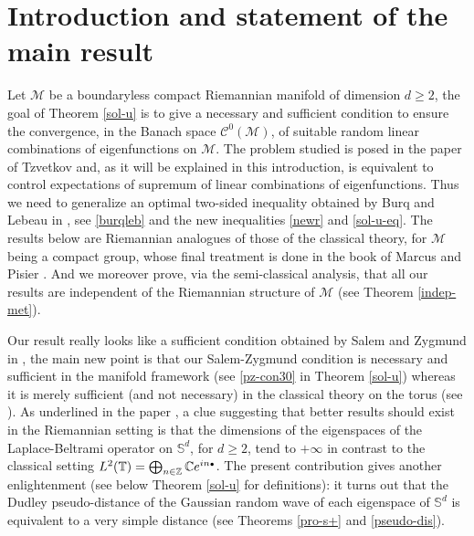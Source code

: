 \documentclass[11pt]{article}
\newcommand{\sbullet}{{\scriptscriptstyle\bullet}}
\theoremstyle{theorem}
\theoremstyle{definition}
\newcommand\Z{\mathbb{Z}}
\newcommand\CC{\mathcal{C}}
\newcommand\bbS{\mathbb{S}}
\begin{document}
\section{Introduction and statement of the main result}
Let $\mathcal{M}$ be a boundaryless compact Riemannian manifold of dimension $d\geq 2$, the goal of Theorem \ref{sol-u} is to give a necessary and sufficient condition to ensure the convergence, in the Banach space $\CC^0(\mathcal{M})$, of suitable random linear combinations of eigenfunctions on $\mathcal{M}$. The problem studied is posed in the paper of Tzvetkov \cite[p.\,XV]{Tzvetkov4} and, as it will be explained in this introduction, is equivalent to control expectations of supremum of linear combinations of eigenfunctions. Thus we need to generalize an optimal two-sided inequality obtained by Burq and Lebeau in \cite{burq-lebeau,burq-lebeau2}, see \eqref{burqleb} and the new inequalities \eqref{newr} and \eqref{sol-u-eq}.
The results below are Riemannian analogues of those of the classical theory, for $\mathcal{M}$ being a compact group, whose final treatment is done in the book of Marcus and Pisier \cite{pisier1981}. And we moreover prove, via the semi-classical analysis, that all our results are independent of the Riemannian structure of $\mathcal{M}$ (see Theorem \ref{indep-met}).%

Our result really looks like a sufficient condition obtained by Salem and Zygmund in \cite[p.\,291]{salem1954}, the main new point is that our Salem-Zygmund condition is necessary and sufficient in the manifold framework (see \eqref{pz-con30} in Theorem \ref{sol-u}) whereas it is merely sufficient (and not necessary) in the classical theory on the torus (see \cite[p.\,292]{salem1954}). As underlined in the paper \cite{burq-lebeau}, a clue suggesting that better results should exist in the Riemannian setting is that the dimensions of the eigenspaces of the Laplace-Beltrami operator on $\bbS^d$, for $d\geq 2$, tend to $+\infty$ in contrast to the classical setting $L^2(\mathbb{T})=\bigoplus_{n\in \Z} \C e^{in\sbullet}$. The present contribution gives another enlightenment (see \hbox{below} Theorem \ref{sol-u} for definitions): it turns out that the Dudley pseudo-distance of the Gaussian random wave of each eigenspace of $\bbS^d$ is equivalent to a very simple distance (see Theorems \ref{pro-s+} and \ref{pseudo-dis}).
\end{document}

